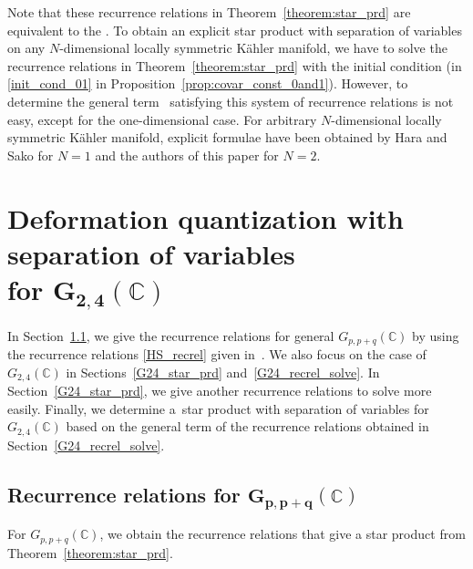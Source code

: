 \documentclass[10pt,a4paper]{amsart}
\numberwithin{equation}{section}
\begin{document}
Note that these recurrence relations in Theorem~\ref{theorem:star_prd} are equivalent to the \cite[equations~(6.9)]{SSU1}. To obtain an explicit star product with separation of variables on any $N$-dimensional locally symmetric K\"ahler manifold, we have to solve the recurrence relations in Theorem~\ref{theorem:star_prd} with the initial condition
(in \eqref{init_cond_01} in Proposition~\ref{prop:covar_const_0and1}). However, to determine the general term~
satisfying this system of recurrence relations is not easy, except for the one-dimensional case.
For %
arbitrary $N$-dimensional locally symmetric K\"ahler manifold, explicit formulae have been obtained by Hara and Sako \cite{HS1,HS2} for $N=1$ and the authors of this paper \cite{OS_Varna,OS_jrnl} for $N=2$.

\section[Deformation quantization with separation of variables for G\_\{2,4\}(C)]{Deformation quantization with separation of variables \\ for $\boldsymbol{G_{2,4}(\mathbb{C})}$}
\label{G24_DQ_sep_var}

In Section~\ref{Gpq_recrel_general}, we give the recurrence relations for general
$ G_{p,p+q}(\mathbb{C})$ by using the recurrence relations \eqref{HS_recrel} given in~\cite{HS1,HS2}. We also focus on the case of $G_{2,4}(\mathbb{C})$ in Sections~\ref{G24_star_prd} and~\ref{G24_recrel_solve}. In Section~\ref{G24_star_prd}, we give another recurrence relations to solve more easily. Finally, we determine a~star product with separation of variables for $G_{2,4}(\mathbb{C})$ based on the general term of the recurrence relations obtained in Section~\ref{G24_recrel_solve}.

\subsection[Recurrence relations for G\_\{p,p+q\}(C)]{Recurrence relations for $\boldsymbol{G_{p,p+q}(\mathbb{C})}$}
\label{Gpq_recrel_general}

For $ G_{p,p+q}(\mathbb{C})$,
we obtain the recurrence relations that give a star product from Theorem~\ref{theorem:star_prd}.
\end{document}
